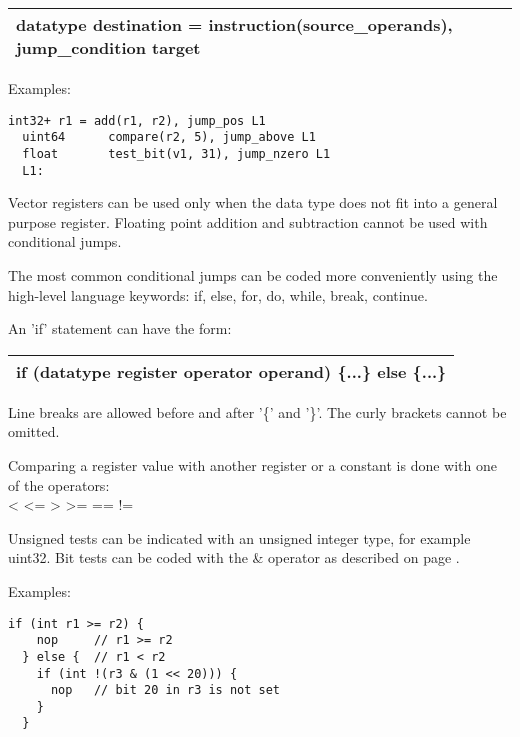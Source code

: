 \documentclass[forwardcom.tex]{subfiles}
\begin{document}
\begin{tabular}{|p{150mm}|}
\hline
\hspace{4mm} datatype destination = instruction(source\_operands), jump\_condition target \\
\hline
\end{tabular}
\vspace{4mm}

Examples:
\vv

\begin{lstlisting}[frame=single]
  int32+ r1 = add(r1, r2), jump_pos L1
  uint64      compare(r2, 5), jump_above L1
  float       test_bit(v1, 31), jump_nzero L1
  L1:
\end{lstlisting}
\vv

Vector registers can be used only when the data type does not fit into a general purpose register. Floating point addition and subtraction cannot be used with conditional jumps.
\vv

The most common conditional jumps can be coded more conveniently using the high-level language keywords: if, else, for, do, while, break, continue.
\vv

An 'if' statement can have the form:
\vv

\begin{tabular}{|p{150mm}|}
\hline
\hspace{4mm} if (datatype register operator operand) \{...\} else \{...\}\\
\hline
\end{tabular}
\vv

Line breaks are allowed before and after '\{' and '\}'. The curly brackets cannot be omitted.

Comparing a register value with another register or a constant is done with one of the operators:\\
\textless \hspace{2mm} \textless= \hspace{2mm} \textgreater \hspace{2mm} \textgreater= \hspace{2mm} 
 == \hspace{2mm} != \hspace{2mm} 
\vv

Unsigned tests can be indicated with an unsigned integer type, for example uint32. 
Bit tests can be coded with the \& operator as described on page \pageref{table:testBitJumpTrueInstruction}.
\vv

Examples:
\vv

\begin{lstlisting}[frame=single]
  if (int r1 >= r2) {
    nop     // r1 >= r2
  } else {  // r1 < r2
    if (int !(r3 & (1 << 20))) {
      nop   // bit 20 in r3 is not set
    }
  }  
\end{lstlisting}
\vv
\end{document}
